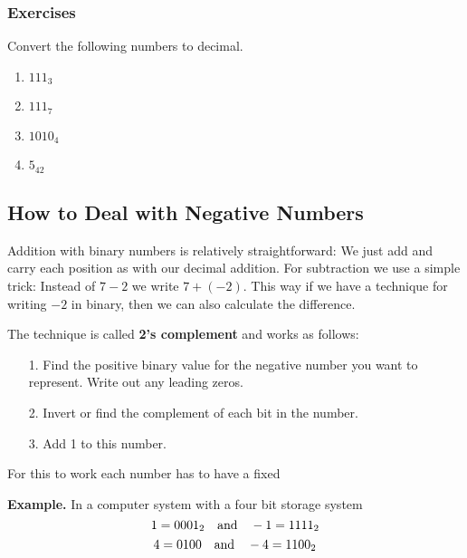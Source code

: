 \documentclass[11pt,a4paper]{report}
\newcommand{\bfb}[1]{{\bf \color{blue} #1}}
\begin{document}
\subsubsection{Exercises}
\begin{ex}
Convert the following numbers to decimal.
\begin{multicols}{4}
\begin{enumerate}
\item $111_{3}$
\item $111_{7}$
\item $1010_{4}$
\item $5_{42}$
\end{enumerate}
\end{multicols} 
\end{ex}

\subsection{How to Deal with Negative Numbers}
Addition with binary numbers is relatively straightforward: We just add and carry each position as with our decimal addition. For subtraction we use a simple trick: Instead of $7-2$ we write $7+(-2)$. This way if we have a technique for writing $-2$ in binary, then we can also calculate the difference. 

The technique is called \bfb{2's complement} and works as follows: 
\begin{enumerate}
\item[1.] Find the positive binary value for the negative number you want to represent. Write out any leading zeros.
\item[2.] Invert or find the complement of each bit in the number.
\item[3.] Add 1 to this number. 
\end{enumerate}

For this to work each number has to have a fixed

{\bf Example.}  In a computer system with a four bit storage system
\[
1 = 0001_2 \quad\text{and}\quad -1 = 1111_2
\]
\[
4 = 0100 \quad\text{and}\quad -4 = 1100_2
\]
\end{document}
